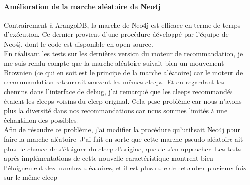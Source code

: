 \documentclass{article} %
\begin{document}
\newpage
\paragraph{Amélioration de la marche aléatoire de Neo4j\\}
Contrairement à ArangoDB, la marche de Neo4j est efficace en terme de temps d'exécution. Ce dernier provient d'une procédure développé par l'équipe de Neo4j, dont le code est disponible en open-source.\\
En réalisant les tests sur les dernières version du moteur de recommandation, je me suis rendu compte que la marche aléatoire suivait bien un mouvement Brownien (ce qui en soit est le principe de la marche aléatoire) car le moteur de recommandation retournait souvent les mêmes cleeps. Et en regardant les chemins dans l'interface de debug, j'ai remarqué que les cleeps recommandés étaient les cleeps voisins du cleep original. Cela pose problème car nous n'avons plus la diversité dans nos recommandations car nous sommes limités à une échantillon des possibles.\\
Afin de résoudre ce problème, j'ai modifier la procédure qu'utilisait Neo4j pour faire la marche aléatoire. J'ai fait en sorte que cette marche pseudo-aléatoire ait plus de chance de s'éloigner du cleep d'origine, que de s'en approcher. Les tests après implémentations de cette nouvelle caractéristique montrent bien l'éloignement des marches aléatoires, et il est plus rare de retomber plusieurs fois sur le même cleep.
\end{document}
